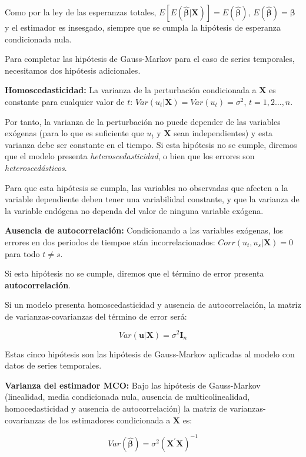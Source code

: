 Como por la ley de las esperanzas totales, $E[E\left(\hat{\boldsymbol{\beta}}|\boldsymbol{X}\right)]=E\left(\hat{\boldsymbol{\beta}}\right)$, $E(\hat{\boldsymbol{\beta}})=\boldsymbol{\beta}$ y el estimador es insesgado, siempre que se cumpla la hip\'otesis de esperanza condicionada nula.

Para completar las hip\'otesis de Gauss-Markov para el caso de series temporales, necesitamos dos hip\'otesis adicionales.

\begin{hipotesis}
\textbf{Homoscedasticidad:} La varianza de la perturbaci\'on condicionada a $\boldsymbol{X}$ es constante para cualquier valor de $t$: $Var(u_t|\boldsymbol{X})=Var(u_t)=\sigma^2$, $t=1,2	\ldots,n$.
\end{hipotesis}

Por tanto, la varianza de la perturbaci\'on no puede depender de las variables ex\'ogenas (para lo que es suficiente que $u_t$ y $\boldsymbol{X}$ sean independientes) y esta varianza debe ser constante en el tiempo. Si esta hip\'otesis no se cumple, diremos que el modelo presenta \textit{heteroscedasticidad}, o bien que los errores son \textit{heterosced\'asticos}.

Para que esta hip\'otesis se cumpla, las variables no observadas que afecten a la variable dependiente deben tener una variabilidad constante, y que la varianza de la variable end\'ogena no dependa del valor de ninguna variable ex\'ogena.

\begin{hipotesis}
\textbf{Ausencia de autocorrelaci\'on:} Condicionando a las variables ex\'ogenas, los errores en dos periodos de tiempoe st\'an incorrelacionados: $Corr(u_t, u_s|\boldsymbol{X})=0$ para todo $t\neq s$.
\end{hipotesis}

Si esta hip\'otesis no se cumple, diremos que el t\'ermino de error presenta \textbf{autocorrelaci\'on}.

Si un modelo presenta homoscedasticidad y ausencia de autocorrelaci\'on, la matriz de varianzas-covarianzas del t\'ermino de error ser\'a:

\[Var(\boldsymbol{u}|\boldsymbol{X})=\sigma^2\boldsymbol{I}_n\]

Estas cinco hip\'otesis son las hip\'otesis de Gauss-Markov aplicadas al modelo con datos de series temporales.

\begin{teorema}
\textbf{Varianza del estimador MCO:} Bajo las hip\'otesis de Gauss-Markov (linealidad, media condicionada nula, ausencia de multicolinealidad, homocedasticidad y ausencia de autocorrelaci\'on) la matriz de varianzas-covarianzas de los estimadores condicionada a $\boldsymbol{X}$ es:

\[Var(\hat{\boldsymbol{\beta}})=\sigma^2(\boldsymbol{X}^{\prime}\boldsymbol{X})^{-1}\]

\end{teorema}


